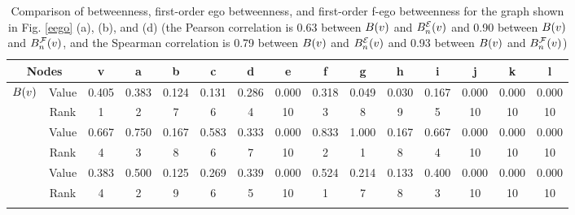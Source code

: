 \begin{center}
\begin{table}[t]
 \caption{Comparison of betweenness, first-order ego betweenness, and first-order f-ego betweenness for the graph shown in Fig. \ref{eego} (a), (b), and (d) (the Pearson correlation is 0.63 between $B({v})$ and $\BE{n}{v}$ and 0.90 between $B({v})$ and $\BF{n}{v}$, and the Spearman correlation is 0.79 between $B({v})$ and $\BE{n}{v}$ and 0.93 between $B({v})$ and $\BF{n}{v}$)}\label{comparison}
 \resizebox{13.7cm}{!} {
 \begin{tabular}{|c|c|c|c|c|c|c|c|c|c|c|c|c|c|c|}
 \hline
\multicolumn{2}{|c|}{Nodes} & v & a & b & c & d & e & f & g & h & i & j & k & l \\
 \hline
\multirow{2}{*}{$B({v})$} & Value & 0.405 & 0.383 & 0.124 & 0.131 & 0.286 & 0.000 & 0.318 & 0.049 & 0.030 & 0.167 & 0.000 & 0.000 & 0.000\\
\hhline{~--------------}
& Rank & 1 & 2 & 7 & 6 & 4 & 10 & 3 & 8 & 9 & 5 & 10 & 10 & 10\\
\hhline{---------------}
\multirow{2}{*}{$\BE{n}{v}$} & Value & 0.667 & 0.750 & 0.167 & 0.583 & 0.333 & 0.000 & 0.833 & 1.000 & 0.167 & 0.667 & 0.000 & 0.000 & 0.000\\
\hhline{~--------------}
& Rank & 4 & 3 & 8 & 6 & 7 & 10 & 2 & 1 & 8 & 4 & 10 & 10 & 10\\
\hhline{---------------}
\multirow{2}{*}{$\BF{n}{v}$} & Value & 0.383 & 0.500 & 0.125 & 0.269 & 0.339 & 0.000 & 0.524 & 0.214 & 0.133 & 0.400 & 0.000 & 0.000 & 0.000\\
\hhline{~--------------}
& Rank & 4 & 2 & 9 & 6 & 5 & 10 & 1 & 7 & 8 & 3 & 10 & 10 & 10\\
\hhline{---------------}
 \hline
 \end{tabular}
}
\end{table}
\end{center}

